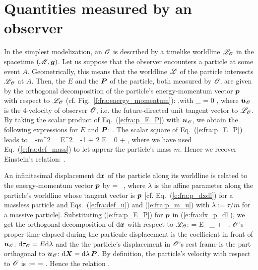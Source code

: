 \section{Quantities measured by an observer} \label{s:fra:measure}

In the simplest modelization, an  $\mathscr{O}$
is described by a timelike worldline $\mathscr{L}_{\mathscr{O}}$ in the spacetime $(\mathscr{M},\bm{g})$.
Let us suppose that the observer encounters a particle at some event $A$.
Geometrically, this means that the worldline $\mathscr{L}$ of the particle
intersects $\mathscr{L}_{\mathscr{O}}$ at $A$. Then, the 
$E$ and the  $\bm{P}$ of the
particle, both measured by $\mathscr{O}$, are given by the orthogonal decomposition of the
particle's energy-momentum vector $\bm{p}$ with respect to $\mathscr{L}_{\mathscr{O}}$
(cf. Fig.~\ref{f:fra:energy_momentum}):
\be \label{e:fra:p_E_P}
    ,\quad\mbox{with}\quad
        _{\Obs}\cdot{} = 0 ,
\ee
where $\bm{u}_{\mathscr{O}}$ is the 4-velocity of observer $\mathscr{O}$, i.e. the future-directed
unit tangent vector to $\mathscr{L}_{\mathscr{O}}$.
By taking the scalar product of Eq.~(\ref{e:fra:p_E_P}) with $\bm{u}_{\mathscr{O}}$,
we obtain the following expressions for $E$ and $\bm{P}$:
\be \label{e:fra:E_obs}
\ee
\be
     .
\ee
The scalar square of Eq.~(\ref{e:fra:p_E_P}) leads to
\be
    _{-m^2} = E^2
    _{-1} + 2 E _{0}
    + \cdot{} ,
\ee
where we have used Eq.~(\ref{e:fra:def_mass}) to let appear the particle's mass
$m$. Hence we recover Einstein's relation:
\be \label{e:fra:E2_m2_P2}
    .
\ee

An infinitesimal displacement $\mathrm{d}\bm{x}$ of the particle along its worldline
is related to the energy-momentum vector $\bm{p}$ by
\be \label{e:fra:dx_p_dl}
    \D{} =  \, \D\lambda,
\ee
where $\lambda$ is the affine parameter along the particle's worldline
whose tangent vector is $\bm{p}$ [cf. Eq.~(\ref{e:fra:p_dxdl}) for a massless
particle and Eqs.~(\ref{e:fra:def_u}) and (\ref{e:fra:p_m_u}) with
$\lambda := \tau/m$ for a massive particle]. Substituting (\ref{e:fra:p_E_P})
for $\bm{p}$ in (\ref{e:fra:dx_p_dl}), we get the orthogonal decomposition
of $\mathrm{d}\bm{x}$ with respect to $\mathscr{L}_{\mathscr{O}}$:
\be
    \D{} = E \D\lambda \, _{\Obs} + \D\lambda\,   .
\ee
$\mathscr{O}$'s proper time elapsed during the particule displacement is the
coefficient in front of $\bm{u}_{\mathscr{O}}$: $\mathrm{d}\tau_{\mathscr{O}} = E \mathrm{d}\lambda$ and the
the particle's displacement in $\mathscr{O}$'s rest frame is the part orthogonal
to $\bm{u}_{\mathscr{O}}$: $\mathrm{d}\bm{X} = \mathrm{d}\lambda\,  \bm{P}$. By definition,
the particle's velocity with respect to $\mathscr{O}$ is
\be
     :=  = .
\ee
Hence the relation
\be \label{e:fra:P_E_V}
     .
\ee

